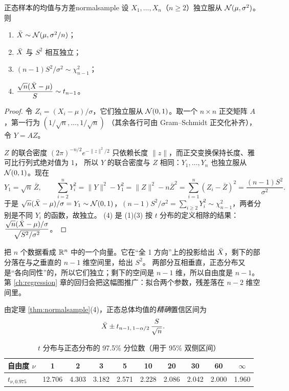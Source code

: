 \begin{theorem}{正态样本的均值与方差}{normalsample}
设 $X_1,\dots,X_n$（$n\ge2$）独立服从 $\mathcal{N}(\mu,\sigma^2)$。则
\begin{enumerate}
\item $\bar{X}\sim\mathcal{N}(\mu,\sigma^2/n)$；
\item $\bar{X}$ 与 $S^2$ 相互独立；
\item $(n-1)S^2/\sigma^2\sim\chi^2_{n-1}$；
\item $\dfrac{\sqrt n(\bar{X}-\mu)}{S}\sim t_{n-1}$。
\end{enumerate}
\end{theorem}
\begin{proof}
令 $Z_i=(X_i-\mu)/\sigma$，它们独立服从 $\mathcal{N}(0,1)$。取一个 $n\times n$ 正交矩阵 $A$，第一行为 $(1/\sqrt n,\dots,1/\sqrt n)$
（其余各行可由 Gram–Schmidt 正交化补齐），令 $Y=AZ$。

$Z$ 的联合密度 $(2\pi)^{-n/2}e^{-\|z\|^2/2}$ 只依赖长度 $\|z\|$，而正交变换保持长度、雅可比行列式绝对值为 $1$，
所以 $Y$ 的联合密度与 $Z$ 相同：$Y_1,\dots,Y_n$ 也独立服从 $\mathcal{N}(0,1)$。现在
\[
Y_1=\sqrt n\,\bar Z,\qquad \sum_{i=2}^nY_i^2=\|Y\|^2-Y_1^2=\|Z\|^2-n\bar Z^2=\sum_{i=1}^n(Z_i-\bar Z)^2=\frac{(n-1)S^2}{\sigma^2}.
\]
于是 $\sqrt n(\bar{X}-\mu)/\sigma=Y_1\sim\mathcal{N}(0,1)$，$(n-1)S^2/\sigma^2=\sum_{i\ge2}Y_i^2\sim\chi^2_{n-1}$，两者分别是不同 $Y_i$ 的函数，故独立。
(4) 是 (1)(3) 按 $t$ 分布的定义相除的结果：$\dfrac{\sqrt n(\bar{X}-\mu)/\sigma}{\sqrt{S^2/\sigma^2}}$。
\end{proof}

\begin{intuition}[自由度的几何意义]
把 $n$ 个数据看成 $\mathbb{R}^n$ 中的一个向量。它在“全 1 方向”上的投影给出 $\bar{X}$，剩下的部分落在与之垂直的 $n-1$ 维空间里，给出 $S^2$。
两部分互相垂直，正态分布又是“各向同性”的，所以它们独立；剩下的空间是 $n-1$ 维，所以自由度是 $n-1$。
第 \ref{ch:regression} 章的回归会把这幅图推广：拟合两个参数，残差落在 $n-2$ 维空间里。
\end{intuition}

由定理 \ref{thm:normalsample}(4)，正态总体均值的\emph{精确}置信区间为
\begin{equation}\label{eq:tci}
\bar{X}\pm t_{n-1,\,1-\alpha/2}\,\frac{S}{\sqrt n}.
\end{equation}

\begin{table}[H]
\centering\small
\caption{$t$ 分布与正态分布的 97.5\% 分位数（用于 95\% 双侧区间）}\label{tab:tq}
\begin{tabular}{l*{9}{c}}
\toprule
自由度 $\nu$ & 1 & 2 & 3 & 5 & 10 & 20 & 30 & 60 & $\infty$ \\
\midrule
$t_{\nu,0.975}$ & 12.706 & 4.303 & 3.182 & 2.571 & 2.228 & 2.086 & 2.042 & 2.000 & 1.960 \\
\bottomrule
\end{tabular}
\end{table}

